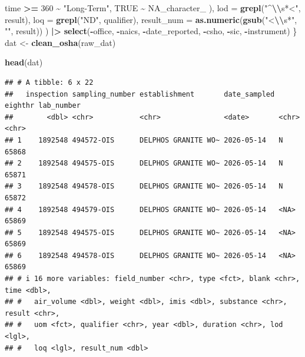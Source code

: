 \documentclass[
]{article}
\newenvironment{Shaded}{\begin{snugshade}}{\end{snugshade}}
\newcommand{\AttributeTok}[1]{\textcolor[rgb]{0.13,0.29,0.53}{#1}}
\newcommand{\ConstantTok}[1]{\textcolor[rgb]{0.56,0.35,0.01}{#1}}
\newcommand{\DecValTok}[1]{\textcolor[rgb]{0.00,0.00,0.81}{#1}}
\newcommand{\FunctionTok}[1]{\textcolor[rgb]{0.13,0.29,0.53}{\textbf{#1}}}
\newcommand{\NormalTok}[1]{#1}
\newcommand{\OtherTok}[1]{\textcolor[rgb]{0.56,0.35,0.01}{#1}}
\newcommand{\SpecialCharTok}[1]{\textcolor[rgb]{0.81,0.36,0.00}{\textbf{#1}}}
\newcommand{\StringTok}[1]{\textcolor[rgb]{0.31,0.60,0.02}{#1}}
\begin{document}
\begin{Shaded}
\begin{Highlighting}[]
\NormalTok{  time }\SpecialCharTok{\textgreater{}=} \DecValTok{360}                 \SpecialCharTok{\textasciitilde{}} \StringTok{"Long{-}Term"}\NormalTok{,}
  \ConstantTok{TRUE}                        \SpecialCharTok{\textasciitilde{}} \ConstantTok{NA\_character\_}
\NormalTok{),}
    \AttributeTok{lod =} \FunctionTok{grepl}\NormalTok{(}\StringTok{"\^{}}\SpecialCharTok{\textbackslash{}\textbackslash{}}\StringTok{s*\textless{}"}\NormalTok{, result),}
 \AttributeTok{loq =} \FunctionTok{grepl}\NormalTok{(}\StringTok{"ND"}\NormalTok{, qualifier),}
    \AttributeTok{result\_num =} \FunctionTok{as.numeric}\NormalTok{(}\FunctionTok{gsub}\NormalTok{(}\StringTok{"\textless{}}\SpecialCharTok{\textbackslash{}\textbackslash{}}\StringTok{s*"}\NormalTok{, }\StringTok{""}\NormalTok{, result))}
\NormalTok{    ) }\SpecialCharTok{|\textgreater{}} 
  \FunctionTok{select}\NormalTok{(}\SpecialCharTok{{-}}\NormalTok{office, }\SpecialCharTok{{-}}\NormalTok{naics, }\SpecialCharTok{{-}}\NormalTok{date\_reported, }\SpecialCharTok{{-}}\NormalTok{csho, }\SpecialCharTok{{-}}\NormalTok{sic, }\SpecialCharTok{{-}}\NormalTok{instrument) }
\NormalTok{\}}
\NormalTok{dat }\OtherTok{\textless{}{-}} \FunctionTok{clean\_osha}\NormalTok{(raw\_dat)  }

\FunctionTok{head}\NormalTok{(dat)  }
\end{Highlighting}
\end{Shaded}

\begin{verbatim}
## # A tibble: 6 x 22
##   inspection sampling_number establishment       date_sampled eighthr lab_number
##        <dbl> <chr>           <chr>               <date>       <chr>   <chr>     
## 1    1892548 494572-OIS      DELPHOS GRANITE WO~ 2026-05-14   N       65868     
## 2    1892548 494575-OIS      DELPHOS GRANITE WO~ 2026-05-14   N       65871     
## 3    1892548 494578-OIS      DELPHOS GRANITE WO~ 2026-05-14   N       65872     
## 4    1892548 494579-OIS      DELPHOS GRANITE WO~ 2026-05-14   <NA>    65869     
## 5    1892548 494575-OIS      DELPHOS GRANITE WO~ 2026-05-14   <NA>    65869     
## 6    1892548 494578-OIS      DELPHOS GRANITE WO~ 2026-05-14   <NA>    65869     
## # i 16 more variables: field_number <chr>, type <fct>, blank <chr>, time <dbl>,
## #   air_volume <dbl>, weight <dbl>, imis <dbl>, substance <chr>, result <chr>,
## #   uom <fct>, qualifier <chr>, year <dbl>, duration <chr>, lod <lgl>,
## #   loq <lgl>, result_num <dbl>
\end{verbatim}

\begin{Shaded}
\end{Shaded}
\end{document}
